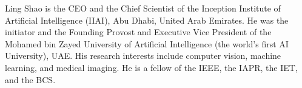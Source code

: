 \documentclass[10pt,journal,compsoc]{IEEEtran}
\begin{document}
\begin{IEEEbiography}
{Ling Shao} is the CEO and the Chief Scientist of the Inception Institute of Artificial Intelligence (IIAI), Abu Dhabi, United Arab Emirates. He was the initiator and the Founding Provost and Executive Vice President of the Mohamed bin Zayed University of Artificial Intelligence (the world's first AI University), UAE. His research interests include computer vision, machine learning, and medical imaging. He is a fellow of the IEEE, the IAPR, the IET, and the BCS. 
\end{IEEEbiography}





\end{document}
